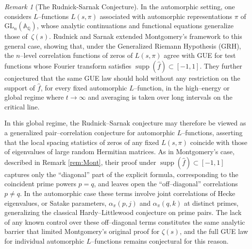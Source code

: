 \documentclass[12pt,reqno]{amsart}
\theoremstyle{plain}
\theoremstyle{definition}
\theoremstyle{remark}
\newtheorem{rem}{Remark}[section]       %
\begin{document}
\begin{rem}[The Rudnick-Sarnak Conjecture]
\label{rem:automorphic-global}
In the automorphic setting, one considers $L$--functions $L(s,\pi)$
associated with automorphic representations $\pi$ of $\mathrm{GL}_n(\mathbb{A}_\mathbb{Q})$,
whose analytic continuations and functional equations generalize those of~$\zeta(s)$.
Rudnick and Sarnak \cite{RS1996} extended Montgomery’s framework to this general case,
showing that, under the Generalized Riemann Hypothesis (GRH),
the $n$--level correlation functions of zeros of $L(s,\pi)$ agree with GUE for test functions whose Fourier transform
satisfies $\operatorname{supp}(\widehat{f})\subset[-1,1]$.
They further conjectured that the same GUE law should hold
without any restriction on the support of $\widehat{f}$,
for every fixed automorphic $L$--function, in the high--energy or
global regime where $t\to\infty$ and averaging is taken over long intervals on the critical line.

In this global regime, the Rudnick--Sarnak conjecture may therefore be viewed as
a generalized pair--correlation conjecture for automorphic $L$--functions,
asserting that the local spacing statistics of zeros of any fixed $L(s,\pi)$
coincide with those of eigenvalues of large random Hermitian matrices. As in Montgomery's case, described in Remark \ref{rem:Mont}, their proof under $\operatorname{supp}(\widehat{f})\subset[-1,1]$ captures only the
``diagonal'' part of the explicit formula, corresponding to the coincident prime powers $p=q$,
and leaves open the ``off--diagonal'' correlations $p\neq q$.
In the automorphic case these terms involve joint correlations of Hecke eigenvalues, or Satake parameters, $\alpha_\pi(p,j)$ and $\alpha_\pi(q,k)$ at distinct primes,
generalizing the classical Hardy--Littlewood conjecture on prime pairs.
The lack of any known control over these off--diagonal terms constitutes the same
analytic barrier that limited Montgomery’s original proof for $\zeta(s)$,
and the full GUE law for individual automorphic $L$--functions
remains conjectural for this reason.


\end{rem}
\end{document}
